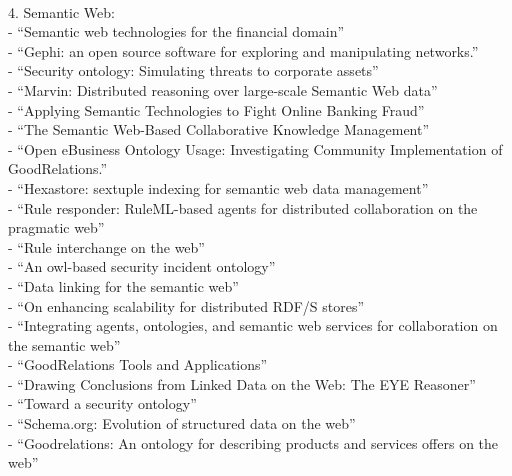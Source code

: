 \\
4. Semantic Web: \\
- ``Semantic web technologies for the financial domain'' \citep{lara2007semantic} \\
- ``Gephi: an open source software for exploring and manipulating networks.'' \citep{bastian2009gephi} \\
- ``Security ontology: Simulating threats to corporate assets'' \citep{ekelhart2006security} \\
- ``Marvin: Distributed reasoning over large-scale Semantic Web data'' \citep{oren2009marvin} \\
- ``Applying Semantic Technologies to Fight Online Banking Fraud'' \citep{carvalhoapplying} \\
- ``The Semantic Web-Based Collaborative Knowledge Management'' \citep{chao2012semantic} \\
- ``Open eBusiness Ontology Usage: Investigating Community Implementation of GoodRelations.'' \citep{ashraf2011open} \\
- ``Hexastore: sextuple indexing for semantic web data management'' \citep{weiss2008hexastore} \\
- ``Rule responder: RuleML-based agents for distributed collaboration on the pragmatic web'' \citep{paschke2007rule} \\
- ``Rule interchange on the web'' \citep{boley2007rule} \\
- ``An owl-based security incident ontology'' \citep{martimiano2005owl} \\
- ``Data linking for the semantic web'' \citep{scharffe2011data} \\
- ``On enhancing scalability for distributed RDF/S stores'' \citep{tsatsanifos2011enhancing} \\
- ``Integrating agents, ontologies, and semantic web services for collaboration on the semantic web'' \citep{stollberg2005integrating} \\
- ``GoodRelations Tools and Applications'' \citep{hepp2009goodrelations} \\
- ``Drawing Conclusions from Linked Data on the Web: The EYE Reasoner'' \citep{verborgh2015drawing} \\
- ``Toward a security ontology'' \citep{donner2003toward} \\
- ``Schema.org: Evolution of structured data on the web'' \citep{guha2016schema} \\
- ``Goodrelations: An ontology for describing products and services offers on the web'' \citep{hepp2008goodrelations} \\
